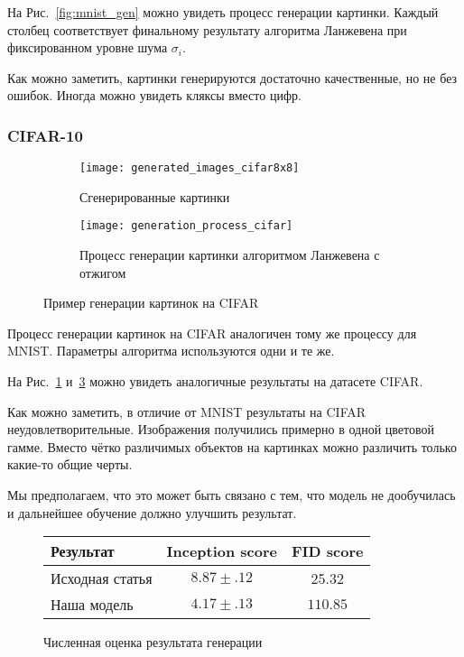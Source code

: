 \documentclass{article}
\begin{document}
На Рис.~\ref{fig:mnist_gen} можно увидеть процесс генерации картинки. Каждый
столбец соответствует финальному результату алгоритма Ланжевена при
фиксированном уровне шума $\sigma_i$.

Как можно заметить, картинки генерируются достаточно качественные, но не
без ошибок. Иногда можно увидеть кляксы вместо цифр.

\subsubsection{CIFAR-10}

\begin{figure}
    \centering
    \begin{subfigure}[b]{0.45\textwidth}
    \texttt{[image: generated\_images\_cifar8x8]}
    \caption{Сгенерированные картинки}\label{fig:cifar8x8sample}
    \end{subfigure}
    \begin{subfigure}[b]{0.45\textwidth}
    \texttt{[image: generation\_process\_cifar]}
    \caption{Процесс генерации картинки алгоритмом Ланжевена с отжигом}\label{fig:cifar_gen}
    \end{subfigure}
    \caption{Пример генерации картинок на CIFAR}
\end{figure}

Процесс генерации картинок на CIFAR аналогичен тому же процессу для MNIST.
Параметры алгоритма используются одни и те же.

На Рис.~\ref{fig:cifar8x8sample} и~\ref{fig:cifar_gen} можно увидеть
аналогичные результаты на датасете CIFAR.

Как можно заметить, в отличие от MNIST результаты на CIFAR
неудовлетворительные. Изображения получились примерно в одной цветовой гамме.
Вместо чётко различимых объектов на картинках можно различить только какие-то
общие черты.  

Мы предполагаем, что это может быть связано с тем, что модель не дообучилась и
дальнейшее обучение должно улучшить результат.

\begin{figure}
\begin{center}
    \begin{tabular}{|l||c|c|}
        \hline
        Результат & Inception score & FID score \\ 
        \hline
        Исходная статья & $8.87\pm.12$ & 25.32 \\
        \hline
        Наша модель & $4.17\pm.13$ & $110.85$ \\
        \hline
    \end{tabular}
\end{center}
\caption{Численная оценка результата генерации}\label{fig:cifar_scores}
\end{figure}
\end{document}
